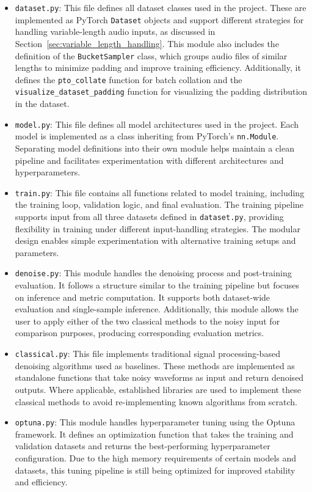 \begin{itemize}
    \item \texttt{dataset.py}: This file defines all dataset classes used in the project. These are implemented as PyTorch \texttt{Dataset} objects and support different strategies for handling variable-length audio inputs, as discussed in Section~\ref{sec:variable_length_handling}. This module also includes the definition of the \texttt{BucketSampler} class, which groups audio files of similar lengths to minimize padding and improve training efficiency. Additionally, it defines the \texttt{pto\_collate} function for batch collation and the \texttt{visualize\_dataset\_padding} function for visualizing the padding distribution in the dataset.
    
    \item \texttt{model.py}: This file defines all model architectures used in the project. Each model is implemented as a class inheriting from PyTorch’s \texttt{nn.Module}. Separating model definitions into their own module helps maintain a clean pipeline and facilitates experimentation with different architectures and hyperparameters.

    \item \texttt{train.py}: This file contains all functions related to model training, including the training loop, validation logic, and final evaluation. The training pipeline supports input from all three datasets defined in \texttt{dataset.py}, providing flexibility in training under different input-handling strategies. The modular design enables simple experimentation with alternative training setups and parameters.

    \item \texttt{denoise.py}: This module handles the denoising process and post-training evaluation. It follows a structure similar to the training pipeline but focuses on inference and metric computation. It supports both dataset-wide evaluation and single-sample inference. Additionally, this module allows the user to apply either of the two classical methods to the noisy input for comparison purposes, producing corresponding evaluation metrics.

    \item \texttt{classical.py}: This file implements traditional signal processing-based denoising algorithms used as baselines. These methods are implemented as standalone functions that take noisy waveforms as input and return denoised outputs. Where applicable, established libraries are used to implement these classical methods to avoid re-implementing known algorithms from scratch.

    \item \texttt{optuna.py}: This module handles hyperparameter tuning using the Optuna framework. It defines an optimization function that takes the training and validation datasets and returns the best-performing hyperparameter configuration. Due to the high memory requirements of certain models and datasets, this tuning pipeline is still being optimized for improved stability and efficiency.
\end{itemize}

